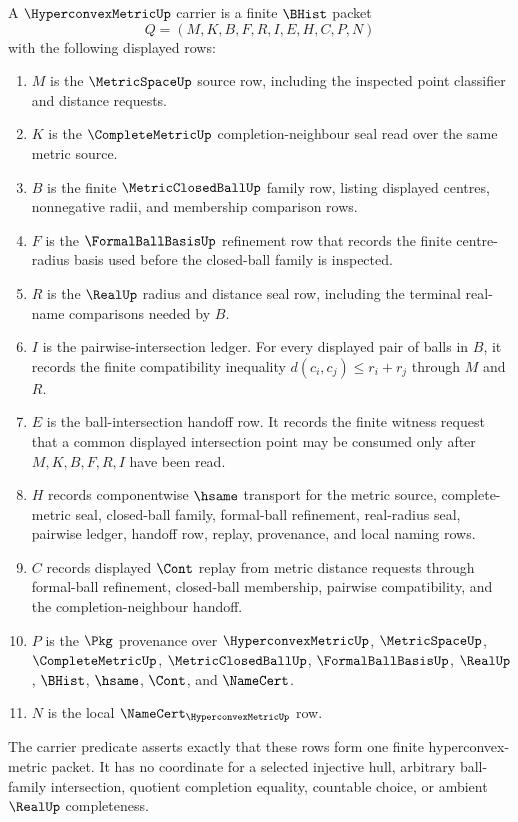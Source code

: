 \begin{definition}\label{def:hyperconvex-metric-carrier}
A $\HyperconvexMetricUp$ carrier is a finite $\BHist$ packet
$$
Q=(M,K,B,F,R,I,E,H,C,P,N)
$$
with the following displayed rows:
\begin{enumerate}
\item $M$ is the $\MetricSpaceUp$ source row, including the inspected point classifier and distance requests.
\item $K$ is the $\CompleteMetricUp$ completion-neighbour seal read over the same metric source.
\item $B$ is the finite $\MetricClosedBallUp$ family row, listing displayed centres, nonnegative radii, and membership comparison rows.
\item $F$ is the $\FormalBallBasisUp$ refinement row that records the finite centre-radius basis used before the closed-ball family is inspected.
\item $R$ is the $\RealUp$ radius and distance seal row, including the terminal real-name comparisons needed by $B$.
\item $I$ is the pairwise-intersection ledger. For every displayed pair of balls in $B$, it records the finite compatibility inequality $d(c_i,c_j)\leq r_i+r_j$ through $M$ and $R$.
\item $E$ is the ball-intersection handoff row. It records the finite witness request that a common displayed intersection point may be consumed only after $M,K,B,F,R,I$ have been read.
\item $H$ records componentwise $\hsame$ transport for the metric source, complete-metric seal, closed-ball family, formal-ball refinement, real-radius seal, pairwise ledger, handoff row, replay, provenance, and local naming rows.
\item $C$ records displayed $\Cont$ replay from metric distance requests through formal-ball refinement, closed-ball membership, pairwise compatibility, and the completion-neighbour handoff.
\item $P$ is the $\Pkg$ provenance over $\HyperconvexMetricUp$, $\MetricSpaceUp$, $\CompleteMetricUp$, $\MetricClosedBallUp$, $\FormalBallBasisUp$, $\RealUp$, $\BHist$, $\hsame$, $\Cont$, and $\NameCert$.
\item $N$ is the local $\NameCert_{\HyperconvexMetricUp}$ row.
\end{enumerate}
The carrier predicate asserts exactly that these rows form one finite hyperconvex-metric packet. It has no coordinate for a selected injective hull, arbitrary ball-family intersection, quotient completion equality, countable choice, or ambient $\RealUp$ completeness.
\end{definition}

